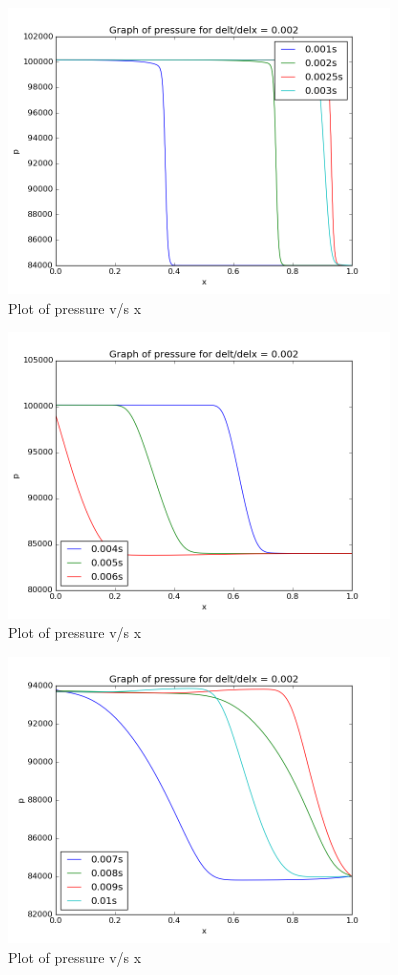 \documentclass[11pt, a4paper]{article}
\begin{document}
\begin{figure}[H]
 \centering
 \includegraphics[width = 0.9\textwidth]{lax_fed_4_7.png}
 \caption{Plot of pressure v/s x}
\end{figure}
\begin{figure}[H]
 \centering
 \includegraphics[width = 0.9\textwidth]{lax_fed_4_8.png}
 \caption{Plot of pressure v/s x}
\end{figure}
\begin{figure}[H]
 \centering
 \includegraphics[width = 0.9\textwidth]{lax_fed_4_9.png}
 \caption{Plot of pressure v/s x}
\end{figure}
\end{document}
